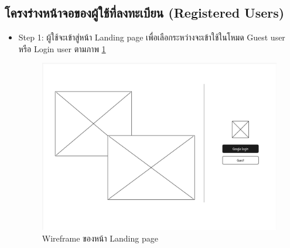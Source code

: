 \begin{mypara}
\begin{itemize}
\end{itemize} 


\subsection{โครงร่างหน้าจอของผู้ใช้ที่ลงทะเบียน (Registered Users)}
\begin{itemize}
    \item Step 1:  ผู้ใช้จะเข้าสู่หน้า Landing page เพื่อเลือกระหว่างจะเข้าใช้ในโหมด Guest user หรือ Login user
    ตามภาพ \ref{fig:WireframeHomepageLogin}
    \begin{figure}[H]
    \centering
    \includegraphics[scale=0.4]
    {homepage.png}
    \caption{Wireframe ของหน้า Landing page}
    \label{fig:WireframeHomepageLogin}
    \end{figure}


\end{itemize}
\end{mypara}
